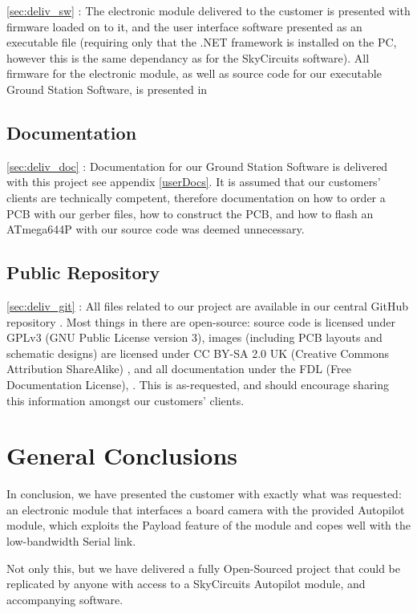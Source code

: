 \ref{sec:deliv_sw} : The electronic module delivered to the customer is 
presented with firmware loaded on to it, and the user interface software 
presented as an executable file (requiring only that the .NET framework 
is installed on the PC, however this is the same dependancy as for the 
SkyCircuits software). All firmware for the electronic module, as well as 
source code for our executable Ground Station Software, is presented in 

\subsection{Documentation}

\ref{sec:deliv_doc} : Documentation for our Ground Station Software is 
delivered with this project see appendix \ref{userDocs}. It is assumed that our customers' clients are technically competent, therefore documentation on 
how to order a PCB with our gerber files, how to construct the PCB, and how 
to flash an ATmega644P with our source code was deemed unnecessary.

\subsection{Public Repository}

\ref{sec:deliv_git} : All files related to our project are available in our 
central GitHub repository \cite{github}. Most things in there are open-source: source code is licensed under GPLv3 (GNU Public License version 3), 
\cite{gpl}
images (including PCB layouts and schematic designs) are licensed under 
CC BY-SA 2.0 UK (Creative Commons Attribution ShareAlike) \cite{ccbysa}, 
and all documentation under the FDL (Free Documentation License), \cite{fdl}. This is as-requested, and should encourage sharing this information 
amongst our customers' clients.

\section{General Conclusions}

In conclusion, we have presented the customer with exactly what was requested: 
an electronic module that interfaces a board camera with the provided Autopilot 
module, which exploits the Payload feature of the module and copes well with 
the low-bandwidth Serial link.

Not only this, but we have delivered a fully Open-Sourced project that could 
be replicated by anyone with access to a SkyCircuits Autopilot module, and 
accompanying software.

